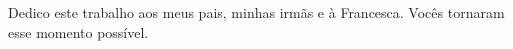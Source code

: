 
\begin{dedicatoria}

Dedico este trabalho aos meus pais, minhas irmãs e à Francesca. Vocês tornaram esse momento possível.

\end{dedicatoria}
